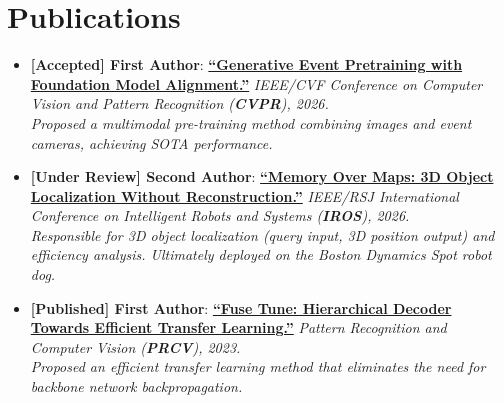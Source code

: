 \documentclass[a4paper,10pt]{article}
\begin{document}
\section{Publications}
  \begin{itemize}[leftmargin=0.15in, label={}]
    \item \small{
      \textbf{[Accepted] First Author}: \href{https://arxiv.org/abs/2603.23032}{\textbf{``Generative Event Pretraining with Foundation Model Alignment.''}} \textit{IEEE/CVF Conference on Computer Vision and Pattern Recognition (\textbf{CVPR}), 2026.} \\
      \textit{Proposed a multimodal pre-training method combining images and event cameras, achieving SOTA performance.}
    }
    
    \item \small{
      \textbf{[Under Review] Second Author}: \href{https://ruizhou-cn.github.io/memory-over-maps/}{\textbf{``Memory Over Maps: 3D Object Localization Without Reconstruction.''}} \textit{IEEE/RSJ International Conference on Intelligent Robots and Systems (\textbf{IROS}), 2026.} \\
      \textit{Responsible for 3D object localization (query input, 3D position output) and efficiency analysis. Ultimately deployed on the Boston Dynamics Spot robot dog.}
    }

    \item \small{
      \textbf{[Published] First Author}: \href{https://link.springer.com/chapter/10.1007/978-981-99-8540-1_17}{\textbf{``Fuse Tune: Hierarchical Decoder Towards Efficient Transfer Learning.''}} \textit{Pattern Recognition and Computer Vision (\textbf{PRCV}), 2023.} \\
      \textit{Proposed an efficient transfer learning method that eliminates the need for backbone network backpropagation.}
    }
  \end{itemize}



\end{document}
